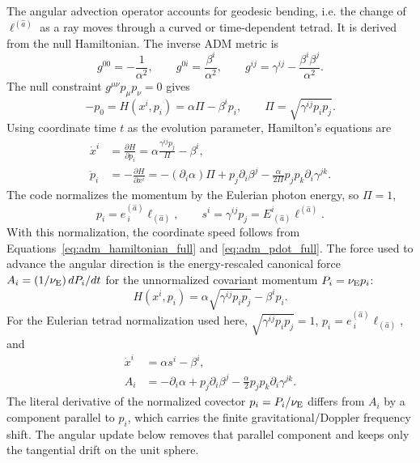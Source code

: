 \documentclass[11pt]{article}
\begin{document}
The angular advection operator accounts for geodesic bending, i.e. the change
of \(\ell^{(\hat a)}\) as a ray moves through a curved or time-dependent
tetrad.  It is derived from the null Hamiltonian.  The inverse ADM metric is
\begin{equation}
  g^{00}=-\frac{1}{\alpha^2},\qquad
  g^{0i}=\frac{\beta^i}{\alpha^2},\qquad
  g^{ij}=\gamma^{ij}-\frac{\beta^i\beta^j}{\alpha^2}.
\end{equation}
The null constraint \(g^{\mu\nu}p_\mu p_\nu=0\) gives
\begin{equation}
  -p_0 = H(x^i,p_i)
  =\alpha \Pi-\beta^ip_i,\qquad
  \Pi=\sqrt{\gamma^{ij}p_ip_j}.
  \label{eq:adm_hamiltonian_full}
\end{equation}
Using coordinate time \(t\) as the evolution parameter, Hamilton's equations
are
\begin{align}
  \dot x^i
  &=\frac{\partial H}{\partial p_i}
    =\alpha\frac{\gamma^{ij}p_j}{\Pi}-\beta^i,\\
  \dot p_i
  &=-\frac{\partial H}{\partial x^i}
    =-(\partial_i\alpha)\Pi
      +p_j\partial_i\beta^j
      -\frac{\alpha}{2\Pi}p_jp_k\partial_i\gamma^{jk}.
  \label{eq:adm_pdot_full}
\end{align}
The code normalizes the momentum by the Eulerian photon energy, so
\(\Pi=1\),
\begin{equation}
  p_i=e^{(\hat a)}_{\ i}\ell_{(\hat a)},\qquad
  s^i=\gamma^{ij}p_j=E^i_{\ (\hat a)}\ell^{(\hat a)}.
\end{equation}
With this normalization, the coordinate speed follows from
Equations~\eqref{eq:adm_hamiltonian_full} and \eqref{eq:adm_pdot_full}.  The
force used to advance the angular direction is the energy-rescaled canonical
force \(A_i=(1/\nu_{\rm E})\,dP_i/dt\) for the unnormalized covariant
momentum \(P_i=\nu_{\rm E}p_i\):
\begin{equation}
  H(x^i,p_i)=\alpha\sqrt{\gamma^{ij}p_i p_j}-\beta^i p_i .
  \label{eq:adm_hamiltonian}
\end{equation}
For the Eulerian tetrad normalization used here,
\(\sqrt{\gamma^{ij}p_i p_j}=1\), \(p_i=e^{(\hat a)}_{\ i}\ell_{(\hat a)}\),
and
\begin{align}
  \dot x^i &= \alpha s^i-\beta^i,\\
  A_i &=
  -\partial_i\alpha+p_j\partial_i\beta^j
  -\frac{\alpha}{2}p_jp_k\partial_i\gamma^{jk}.
  \label{eq:adm_pdot}
\end{align}
The literal derivative of the normalized covector \(p_i=P_i/\nu_{\rm E}\)
differs from \(A_i\) by a component parallel to \(p_i\), which carries the
finite gravitational/Doppler frequency shift.  The angular update below removes
that parallel component and keeps only the tangential drift on the unit sphere.
\end{document}

